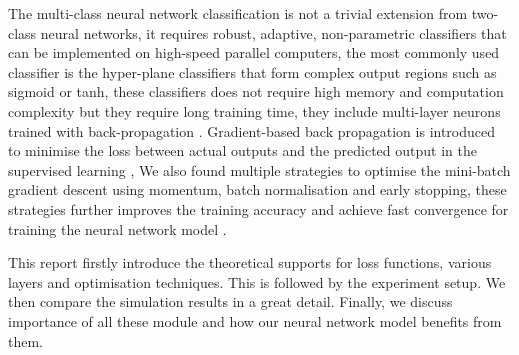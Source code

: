 The multi-class neural network classification is not a trivial extension from two-class neural networks,
it requires robust, adaptive, non-parametric classifiers that can be implemented on high-speed parallel computers,
the most commonly used classifier is the hyper-plane classifiers that form complex output regions such as sigmoid or tanh,
these classifiers does not require high memory and computation complexity but they require long training time,
they include multi-layer neurons trained with back-propagation \citet{OU20074}.
Gradient-based back propagation is introduced to minimise the loss between actual outputs and the predicted output in the supervised learning \citet{lecun1998Gradient},
We also found multiple strategies to optimise the mini-batch gradient descent using momentum, batch normalisation and early stopping,
these strategies further improves the training accuracy and achieve fast convergence for training the neural network model \citet{ruder2016overview}.

This report firstly introduce the theoretical supports for loss functions, various layers and optimisation techniques. 
This is followed by the experiment setup. We then compare the simulation results in a great detail.
Finally, we discuss importance of all these module and how our neural network model benefits from them.

